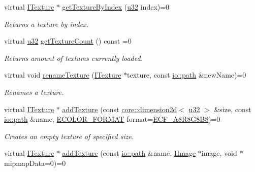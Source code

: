\begin{DoxyCompactItemize}
virtual \hyperlink{classirr_1_1video_1_1ITexture}{I\+Texture} $\ast$ \hyperlink{classirr_1_1video_1_1IVideoDriver_abfe395b1320ac52cea6be0e912135351}{get\+Texture\+By\+Index} (\hyperlink{namespaceirr_a0416a53257075833e7002efd0a18e804}{u32} index)=0
\begin{DoxyCompactList}\small\item\em Returns a texture by index. \end{DoxyCompactList}\item 
virtual \hyperlink{namespaceirr_a0416a53257075833e7002efd0a18e804}{u32} \hyperlink{classirr_1_1video_1_1IVideoDriver_a4c3f976980dd8387db37feca8c8e2d73}{get\+Texture\+Count} () const =0
\begin{DoxyCompactList}\small\item\em Returns amount of textures currently loaded. \end{DoxyCompactList}\item 
virtual void \hyperlink{classirr_1_1video_1_1IVideoDriver_a2cefddb9ebd7f46ee946c04b301a5c5b}{rename\+Texture} (\hyperlink{classirr_1_1video_1_1ITexture}{I\+Texture} $\ast$texture, const \hyperlink{namespaceirr_1_1io_a6468281622ce3a1c46b72e19f32dded5}{io\+::path} \&new\+Name)=0
\begin{DoxyCompactList}\small\item\em Renames a texture. \end{DoxyCompactList}\item 
virtual \hyperlink{classirr_1_1video_1_1ITexture}{I\+Texture} $\ast$ \hyperlink{classirr_1_1video_1_1IVideoDriver_a8c02ee280bb738cdf38b77e7a798244e}{add\+Texture} (const \hyperlink{classirr_1_1core_1_1dimension2d}{core\+::dimension2d}$<$ \hyperlink{namespaceirr_a0416a53257075833e7002efd0a18e804}{u32} $>$ \&size, const \hyperlink{namespaceirr_1_1io_a6468281622ce3a1c46b72e19f32dded5}{io\+::path} \&name, \hyperlink{namespaceirr_1_1video_a1d5e487888c32b1674a8f75116d829ed}{E\+C\+O\+L\+O\+R\+\_\+\+F\+O\+R\+M\+AT} format=\hyperlink{namespaceirr_1_1video_a1d5e487888c32b1674a8f75116d829edac3d45e946a56d11bd43dc18661dfe7ec}{E\+C\+F\+\_\+\+A8\+R8\+G8\+B8})=0
\begin{DoxyCompactList}\small\item\em Creates an empty texture of specified size. \end{DoxyCompactList}\item 
virtual \hyperlink{classirr_1_1video_1_1ITexture}{I\+Texture} $\ast$ \hyperlink{classirr_1_1video_1_1IVideoDriver_abfebeb09a692c0d6b4741d952d97668e}{add\+Texture} (const \hyperlink{namespaceirr_1_1io_a6468281622ce3a1c46b72e19f32dded5}{io\+::path} \&name, \hyperlink{classirr_1_1video_1_1IImage}{I\+Image} $\ast$image, void $\ast$mipmap\+Data=0)=0

\end{DoxyCompactItemize}
